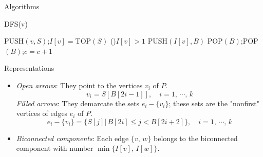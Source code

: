 \documentclass{beamer}
\begin{document}
\begin{frame}{Algorithms}
	\SetAlFnt{\small}
	\begin{procedure}[H]
		\caption{DFS(v)}
		PUSH$(v,S)$;\quad $I[v]=$TOP$(S)$\;
		\If(){$I[v] > 1$}{
			PUSH$(I[v],B)$\;
		}
		 {
			POP$(B)$;\quad POP$(B)$;\quad $c = c + 1$\;
		}
	\end{procedure}
\end{frame}

\begin{frame}{Representations}
	\begin{itemize}
		\item
		\emph{Open arrows}: They point to the vertices $v_i$ of $P$.
		$$v_i=S[B[2i-1]],\quad i=1,\,\cdots,\,k$$
		\emph{Filled arrows}: They demarcate the sets $e_i-\{v_i\}$; these sets
		are the "nonfirst" vertices of edges $e_i$ of $P$.
		$$e_i-\{v_i\}=\{S[j]\vert\,B[2i]\leq j < B[2i+2]\},\quad i=1,\,\cdots,\,k$$
		\item
		\emph{Biconnected components}: Each edge $\{v,\,w\}$ belongs to the
		biconnected component with number $\min\{I[v],\,I[w]\}$.
	\end{itemize}
\end{frame}
\end{document}
